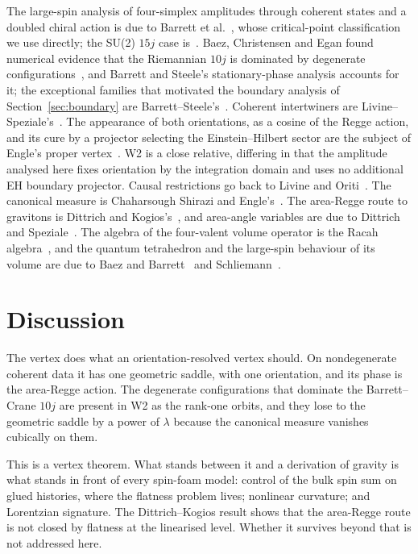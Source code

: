 \documentclass[11pt]{article}
\numberwithin{equation}{section}
\theoremstyle{definition}
\theoremstyle{remark}
\begin{document}
The large-spin analysis of four-simplex amplitudes through coherent states and a
doubled chiral action is due to Barrett et al.~\cite{BarrettEtAl2009}, whose
critical-point classification we use directly; the SU(2) $15j$ case
is~\cite{BFH2009}. Baez, Christensen and Egan found numerical evidence that the Riemannian $10j$ is
dominated by degenerate configurations~\cite{BCE2002}, and Barrett and Steele's
stationary-phase analysis accounts for it; the exceptional families that motivated
the boundary analysis of Section~\ref{sec:boundary} are
Barrett--Steele's~\cite{BarrettSteele2003}. Coherent intertwiners are
Livine--Speziale's~\cite{LivineSpeziale2007}. The appearance of both orientations,
as a cosine of the Regge action, and its cure by a projector selecting the
Einstein--Hilbert sector are the subject of Engle's proper vertex~\cite{Engle2011}.
W2 is a close relative, differing in that the amplitude analysed here fixes
orientation by the integration domain and uses no additional EH boundary
projector. Causal restrictions go
back to Livine and Oriti~\cite{LivineOriti2002}. The canonical measure is
Chaharsough Shirazi and Engle's~\cite{ShiraziEngle2014}. The area-Regge route to
gravitons is Dittrich and Kogios's~\cite{DittrichKogios2023}, and area-angle
variables are due to Dittrich and Speziale~\cite{DittrichSpeziale2008}. The algebra of
the four-valent volume operator is the Racah algebra~\cite{Racah2019}, and the
quantum tetrahedron and the large-spin behaviour of its volume are due to Baez
and Barrett~\cite{BaezBarrett1999} and Schliemann~\cite{Schliemann2013}.

\section{Discussion}\label{sec:disc}

The vertex does what an orientation-resolved vertex should. On nondegenerate
coherent data it has one geometric saddle, with one orientation, and its phase is
the area-Regge action. The degenerate configurations that dominate the
Barrett--Crane $10j$ are present in W2 as the rank-one orbits, and they lose to
the geometric saddle by a power of $\lambda$ because the canonical measure
vanishes cubically on them.

This is a vertex theorem. What stands between it and a derivation of gravity is
what stands in front of every spin-foam model: control of the bulk spin sum on
glued histories, where the flatness problem lives; nonlinear curvature; and
Lorentzian signature. The Dittrich--Kogios result shows that the area-Regge route
is not closed by flatness at the linearised level. Whether it survives beyond that
is not addressed here.
\end{document}
